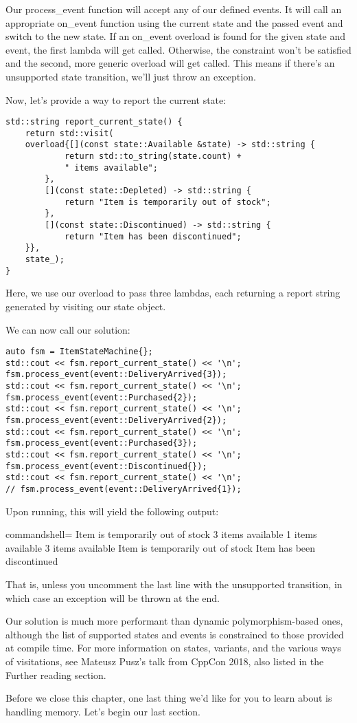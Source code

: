 Our process\_event function will accept any of our defined events. It will call an appropriate on\_event function using the current state and the passed event and switch to the new state. If an on\_event overload is found for the given state and event, the first lambda will get called. Otherwise, the constraint won't be satisfied and the second, more generic overload will get called. This means if there's an unsupported state transition, we'll just throw an exception.

Now, let's provide a way to report the current state:

\begin{lstlisting}[style=styleCXX]
std::string report_current_state() {
	return std::visit(
	overload{[](const state::Available &state) -> std::string {
			return std::to_string(state.count) +
			" items available";
		},
		[](const state::Depleted) -> std::string {
			return "Item is temporarily out of stock";
		},
		[](const state::Discontinued) -> std::string {
			return "Item has been discontinued";
	}},
	state_);
}
\end{lstlisting}

Here, we use our overload to pass three lambdas, each returning a report string generated by visiting our state object.

We can now call our solution:

\begin{lstlisting}[style=styleCXX]
auto fsm = ItemStateMachine{};
std::cout << fsm.report_current_state() << '\n';
fsm.process_event(event::DeliveryArrived{3});
std::cout << fsm.report_current_state() << '\n';
fsm.process_event(event::Purchased{2});
std::cout << fsm.report_current_state() << '\n';
fsm.process_event(event::DeliveryArrived{2});
std::cout << fsm.report_current_state() << '\n';
fsm.process_event(event::Purchased{3});
std::cout << fsm.report_current_state() << '\n';
fsm.process_event(event::Discontinued{});
std::cout << fsm.report_current_state() << '\n';
// fsm.process_event(event::DeliveryArrived{1});
\end{lstlisting}

Upon running, this will yield the following output:

\begin{tcblisting}{commandshell={}}
Item is temporarily out of stock
3 items available
1 items available
3 items available
Item is temporarily out of stock
Item has been discontinued
\end{tcblisting}

That is, unless you uncomment the last line with the unsupported transition, in which case an exception will be thrown at the end.

Our solution is much more performant than dynamic polymorphism-based ones, although the list of supported states and events is constrained to those provided at compile time. For more information on states, variants, and the various ways of visitations, see Mateusz Pusz's talk from CppCon 2018, also listed in the Further reading section.

Before we close this chapter, one last thing we'd like for you to learn about is handling memory. Let's begin our last section.
